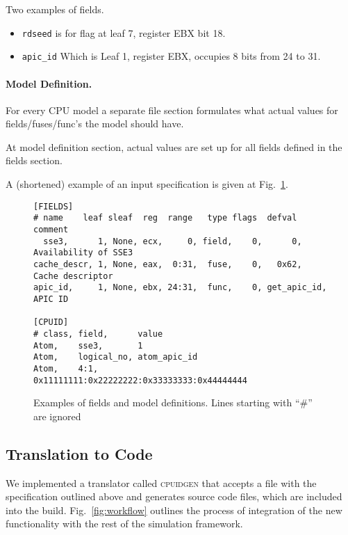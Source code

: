 \documentclass[a4paper,10pt,oneside,unicode]{article}
\newcommand{\cpuidgen}{\textsc{cpuidgen} }
\begin{document}
Two examples of fields.
\begin{itemize}
\item \texttt{rdseed} is for flag at leaf 7, register EBX bit 18.
\item \texttt{apic\_id} Which is Leaf 1, register EBX, occupies 8 bits from 24 to 31.
\end{itemize}

\paragraph{Model Definition.} For every CPU model a separate file section formulates what actual values for fields/fuses/func's the model should have. 

At model definition section, actual values are set up for all fields defined in the fields section.

A (shortened) example of an input specification is given at Fig.~\ref{fig:field-spec}.

\begin{figure}[htbp]
    \centering
\begin{verbatim}
[FIELDS]
# name    leaf sleaf  reg  range   type flags  defval       comment
  sse3,      1, None, ecx,     0, field,    0,      0,      Availability of SSE3
cache_descr, 1, None, eax,  0:31,  fuse,    0,   0x62,      Cache descriptor
apic_id,     1, None, ebx, 24:31,  func,    0, get_apic_id, APIC ID

[CPUID]
# class, field,      value
Atom,    sse3,       1
Atom,    logical_no, atom_apic_id
Atom,    4:1,        0x11111111:0x22222222:0x33333333:0x44444444

\end{verbatim}
\caption{Examples of fields and model definitions. Lines starting with “\#” are ignored}\label{fig:field-spec}
\end{figure}

\subsection{Translation to Code}

We implemented a translator called \cpuidgen that accepts a file with the specification outlined above and generates source code files, which are included into the build. Fig.~\ref{fig:workflow} outlines the process of integration of the new functionality with the rest of the simulation framework.
\end{document}
